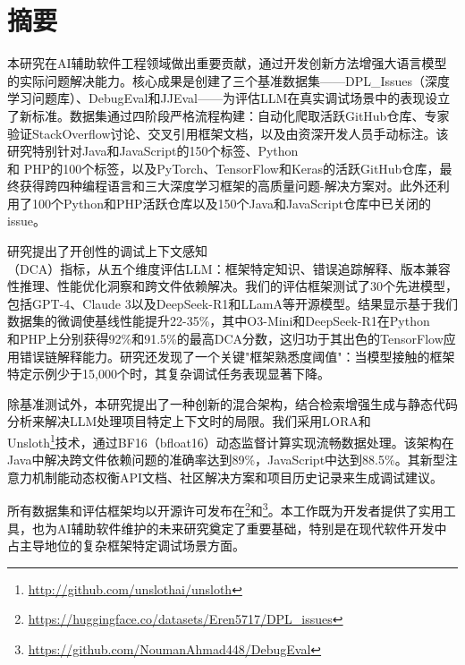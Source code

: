 \chapter{摘\quad 要}%
\linespread{1.5}

本研究在AI辅助软件工程领域做出重要贡献，通过开发创新方法增强大语言模型的实际问题解决能力。核心成果是创建了三个基准数据集——DPL\_Issues（深度学习问题库）、DebugEval和JJEval——为评估LLM在真实调试场景中的表现设立了新标准。数据集通过四阶段严格流程构建：自动化爬取活跃GitHub仓库、专家验证StackOverflow讨论、交叉引用框架文档，以及由资深开发人员手动标注。该研究特别针对Java和JavaScript的150个标签、Python \\ 和 PHP的100个标签，以及PyTorch、TensorFlow和Keras的活跃GitHub仓库，最终获得跨四种编程语言和三大深度学习框架的高质量问题-解决方案对。此外还利用了100个Python和PHP活跃仓库以及150个Java和JavaScript仓库中已关闭的issue。

研究提出了开创性的调试上下文感知 \\（DCA）指标，从五个维度评估LLM：框架特定知识、错误追踪解释、版本兼容性推理、性能优化洞察和跨文件依赖解决。我们的评估框架测试了30个先进模型，包括GPT-4、Claude 3以及DeepSeek-R1和LLamA等开源模型。结果显示基于我们数据集的微调使基线性能提升22-35\%，其中O3-Mini和DeepSeek-R1在Python \\ 和PHP上分别获得92\%和91.5\%的最高DCA分数，这归功于其出色的TensorFlow应用错误链解释能力。研究还发现了一个关键"框架熟悉度阈值"：当模型接触的框架特定示例少于15,000个时，其复杂调试任务表现显著下降。

除基准测试外，本研究提出了一种创新的混合架构，结合检索增强生成与静态代码分析来解决LLM处理项目特定上下文时的局限。我们采用LORA和 \\Unsloth\footnote{\url{http://github.com/unslothai/unsloth}}技术，通过BF16（bfloat16）动态监督计算实现流畅数据处理。该架构在Java中解决跨文件依赖问题的准确率达到89\%，JavaScript中达到88.5\%。其新型注意力机制能动态权衡API文档、社区解决方案和项目历史记录来生成调试建议。

所有数据集和评估框架均以开源许可发布在\footnote{\url{https://huggingface.co/datasets/Eren5717/DPL_issues}}和\footnote{\url{https://github.com/NoumanAhmad448/DebugEval}}。本工作既为开发者提供了实用工具，也为AI辅助软件维护的未来研究奠定了重要基础，特别是在现代软件开发中占主导地位的复杂框架特定调试场景方面。

